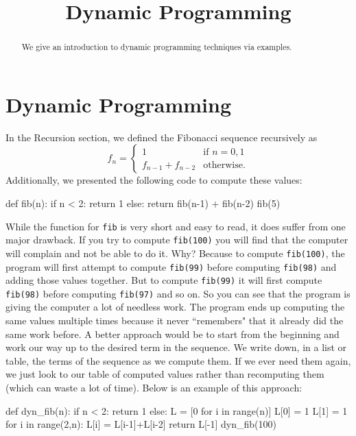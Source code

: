 \documentclass{ximera}
\title{Dynamic Programming}
\begin{document}
  
\begin{abstract}  
We give an introduction to dynamic programming techniques via examples.
\end{abstract}  
\maketitle

\section{Dynamic Programming}

In the Recursion section, we defined the Fibonacci sequence recursively as $$f_n=\begin{cases} 1 & \text{if $n=0,1$}\\ f_{n-1}+f_{n-2} & \text{otherwise.}\end{cases}$$ Additionally, we presented the following code to compute these values:
\begin{sageCell}
def fib(n):
        if n < 2:
                return 1
        else:
                return fib(n-1) + fib(n-2)			
fib(5)
\end{sageCell}
While the function for \verb|fib| is very short and easy to read, it does suffer from one major drawback. If you try to compute \verb|fib(100)| you will find that the computer will complain and not be able to do it. Why? Because to compute \verb|fib(100)|, the program will first attempt to compute \verb|fib(99)| before computing \verb|fib(98)| and adding those values together. But to compute \verb|fib(99)| it will first compute \verb|fib(98)| before computing \verb|fib(97)| and so on. So you can see that the program is giving the computer a lot of needless work. The program ends up computing the same values multiple times because it never ``remembers" that it already did the same work before. A better approach would be to start from the beginning and work our way up to the desired term in the sequence. We write down, in a list or table, the terms of the sequence as we compute them. If we ever need them again, we just look to our table of computed values rather than recomputing them (which can waste a lot of time). Below is an example of this approach:
\begin{sageCell}
def dyn_fib(n):
        if n < 2:
                return 1
        else:
                L = [0 for i in range(n)]
                L[0] = 1
                L[1] = 1
                for i in range(2,n):
                        L[i] = L[i-1]+L[i-2]
                return L[-1]
dyn_fib(100)
\end{sageCell}
\end{document}

